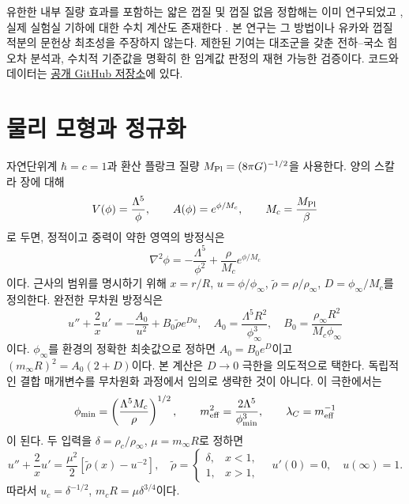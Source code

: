 \documentclass[11pt,a4paper]{article}
\begin{document}
유한한 내부 질량 효과를 포함하는 얇은 껍질 및 껍질 없음 정합해는 이미 연구되었고
\cite{TamakiTsujikawa}, 실제 실험실 기하에 대한 수치 계산도 존재한다
\cite{Elder2016,Schlogel2016}. 본 연구는 그 방법이나 유카와 껍질 적분의 문헌상
최초성을 주장하지 않는다. 제한된 기여는 대조군을 갖춘 전하--국소 힘 오차 분석과,
수치적 기준값을 명확히 한 임계값 판정의 재현 가능한 검증이다. 코드와 데이터는
\href{https://github.com/Lasqui-Ponto/Mechanics_Term_Project/tree/agent/improve-chameleon-project/Thin_Shell_Study}{공개 GitHub 저장소}에 있다.

\section{물리 모형과 정규화}
자연단위계 $\hbar=c=1$과 환산 플랑크 질량 $M_{\mathrm{Pl}}=(8\pi G)^{-1/2}$을 사용한다.
양의 스칼라 장에 대해
\begin{equation}
 V(\phi)=\frac{\Lambda^5}{\phi},\qquad A(\phi)=e^{\phi/M_c},
 \qquad M_c=\frac{M_{\mathrm{Pl}}}{\beta}
\end{equation}
로 두면, 정적이고 중력이 약한 영역의 방정식은
\begin{equation}
 \nabla^2\phi=-\frac{\Lambda^5}{\phi^2}+\frac{\rho}{M_c}e^{\phi/M_c}
\end{equation}
이다. 근사의 범위를 명시하기 위해 $x=r/R$, $u=\phi/\phi_\infty$,
$\widetilde\rho=\rho/\rho_\infty$, $D=\phi_\infty/M_c$를 정의한다.
완전한 무차원 방정식은
\begin{equation}
 u''+\frac2x u'=-\frac{A_0}{u^2}+B_0\widetilde\rho e^{Du},
 \quad A_0=\frac{\Lambda^5R^2}{\phi_\infty^3},\quad
 B_0=\frac{\rho_\infty R^2}{M_c\phi_\infty}
\end{equation}
이다. $\phi_\infty$를 환경의 정확한 최솟값으로 정하면 $A_0=B_0e^D$이고
$(m_\infty R)^2=A_0(2+D)$이다. 본 계산은 $D\to0$ 극한을 의도적으로 택한다.
독립적인 결합 매개변수를 무차원화 과정에서 임의로 생략한 것이 아니다.
이 극한에서는
\begin{equation}
 \phi_{\min}=\left(\frac{\Lambda^5M_c}{\rho}\right)^{1/2},\qquad
 m_{\rm eff}^2=\frac{2\Lambda^5}{\phi_{\min}^3},\qquad
 \lambda_C=m_{\rm eff}^{-1}
\end{equation}
이 된다. 두 입력을 $\delta=\rho_c/\rho_\infty$, $\mu=m_\infty R$로 정하면
\begin{equation}
 u''+\frac2x u'=\frac{\mu^2}{2}[\widetilde\rho(x)-u^{-2}],
 \quad \widetilde\rho=\begin{cases}\delta,&x<1,\\1,&x>1,\end{cases}
 \quad u'(0)=0,\quad u(\infty)=1.
 \label{eq:bvp}
\end{equation}
따라서 $u_c=\delta^{-1/2}$, $m_cR=\mu\delta^{3/4}$이다.
\end{document}
